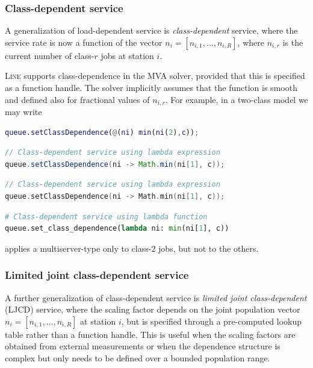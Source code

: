 \subsubsection{Class-dependent service}
A generalization of load-dependent service is \textit{class-dependent} service, where the service rate is now a function of the vector $n_i=[n_{i,1},\ldots,n_{i,R}]$, where $n_{i,r}$ is the current number of class-$r$ jobs at station $i$. 

\textsc{Line} supports class-dependence in the MVA solver, provided that this is specified as a function handle. The solver implicitly assumes that the function is smooth and defined also for fractional values of $n_{i,r}$. For example, in a two-class model we may write
\begin{MATLAB}
\begin{lstlisting}[language = matlab]
queue.setClassDependence(@(ni) min(ni(2),c)); 
\end{lstlisting}
\end{MATLAB}
\begin{JAVA}
\begin{lstlisting}[language=java, basicstyle=\ttfamily\scriptsize]
// Class-dependent service using lambda expression
queue.setClassDependence(ni -> Math.min(ni[1], c));
\end{lstlisting}
\end{JAVA}
\begin{KOTLIN}
\begin{lstlisting}[language=kotlin, basicstyle=\ttfamily\scriptsize]
// Class-dependent service using lambda expression
queue.setClassDependence(ni -> Math.min(ni[1], c));
\end{lstlisting}
\end{KOTLIN}
\begin{PYTHON}
\begin{lstlisting}[language = python]
# Class-dependent service using lambda function
queue.set_class_dependence(lambda ni: min(ni[1], c))
\end{lstlisting}
\end{PYTHON}
applies a multiserver-type only to class-2 jobs, but not to the others.

\subsubsection{Limited joint class-dependent service}
\label{sec:ljcd}
A further generalization of class-dependent service is \textit{limited joint class-dependent} (LJCD) service, where the scaling factor depends on the joint population vector $n_i=[n_{i,1},\ldots,n_{i,R}]$ at station $i$, but is specified through a pre-computed lookup table rather than a function handle. This is useful when the scaling factors are obtained from external measurements or when the dependence structure is complex but only needs to be defined over a bounded population range.

